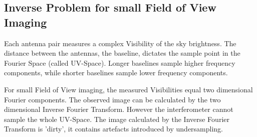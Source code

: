 \subsection{Inverse Problem for small Field of View Imaging}
Each antenna pair measures a complex Visibility of the sky brightness. The distance between the antennas, the baseline, dictates the sample point in the Fourier Space (called UV-Space). Longer baselines sample higher frequency components, while shorter baselines sample lower frequency components. 

For small Field of View imaging, the measured Visibilities equal two dimensional Fourier components. The observed image can be calculated by the two dimensional Inverse Fourier Transform. However the interferometer cannot sample the whole UV-Space. The image calculated by the Inverse Fourier Transform is 'dirty', it contains artefacts introduced by undersampling. 

